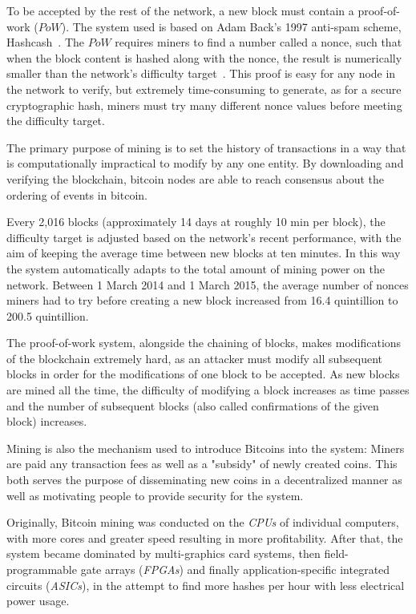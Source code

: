 To be accepted by the rest of the network, a new block must contain a proof-of-work ($PoW$). The system used is based on Adam Back's 1997 anti-spam scheme, Hashcash~\cite{Nakamoto_bitcoin:a}.
The $PoW$ requires miners to find a number called a nonce, such that when the block content is hashed along with the nonce, the result is numerically smaller than the network's difficulty target~\cite{Nakamoto_bitcoin:a}. This proof is easy for any node in the network to verify, but extremely time-consuming to generate, as for a secure cryptographic hash, miners must try many different nonce values before meeting the difficulty target.

The primary purpose of mining is to set the history of transactions in a way that is computationally impractical to modify by any one entity. By downloading and verifying the blockchain, bitcoin nodes are able to reach consensus about the ordering of events in bitcoin.~\cite{wiki}

Every 2,016 blocks (approximately 14 days at roughly 10 min per block), the difficulty target is adjusted based on the network's recent performance, with the aim of keeping the average time between new blocks at ten minutes. In this way the system automatically adapts to the total amount of mining power on the network. Between 1 March 2014 and 1 March 2015, the average number of nonces miners had to try before creating a new block increased from 16.4 quintillion to 200.5 quintillion.\cite{difficulty_history}

The proof-of-work system, alongside the chaining of blocks, makes modifications of the blockchain extremely hard, as an attacker must modify all subsequent blocks in order for the modifications of one block to be accepted. As new blocks are mined all the time, the difficulty of modifying a block increases as time passes and the number of subsequent blocks (also called confirmations of the given block) increases.~\cite{economist}

Mining is also the mechanism used to introduce Bitcoins into the system: Miners are paid any transaction fees as well as a "subsidy" of newly created coins. This both serves the purpose of disseminating new coins in a decentralized manner as well as motivating people to provide security for the system.~\cite{wiki}

Originally, Bitcoin mining was conducted on the \textit{CPUs} of individual computers, with more cores and greater speed resulting in more profitability. After that, the system became dominated by multi-graphics card systems, then field-programmable gate arrays (\textit{FPGAs}) and finally application-specific integrated circuits (\textit{ASICs}), in the attempt to find more hashes per hour with less electrical power usage.

